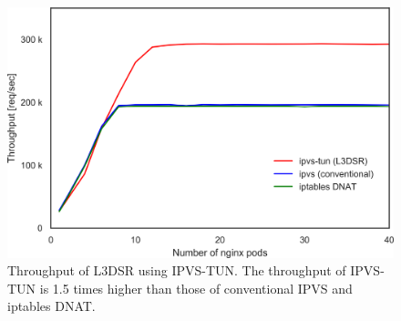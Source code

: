 \begin{figure}[h]
  \centering
  \includegraphics[width=0.75\columnwidth]{Figs/ipvs_l3dsr_1g.png}
  \par\bigskip
  \centering
  \begin{minipage}{0.9\columnwidth}
    \caption[Throughput of L3DSR using IPVS-TUN.]{
      Throughput of L3DSR using IPVS-TUN.
      The throughput of IPVS-TUN is 1.5 times higher than those of conventional IPVS and iptables DNAT.
    }
    \label{fig:ipvs_l3dsr_1g.png}
  \end{minipage}
\end{figure}

